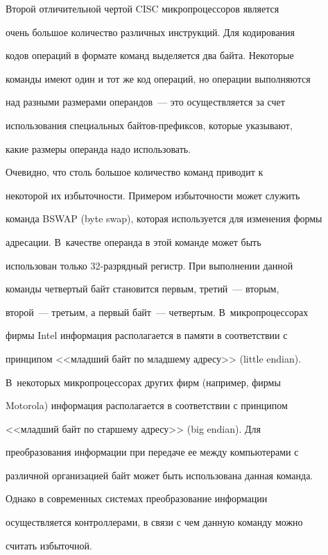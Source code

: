  


 Второй отличительной чертой CISC микропроцессоров является 


очень большое количество различных инструкций. Для кодирования 


кодов операций в формате команд выделяется два байта.  Некоторые  


команды имеют один и тот же код операций,  но операции выполняются 


над разными размерами операндов~--- это осуществляется за счет 


использования специальных бай\-тов-пре\-фик\-сов, которые указывают, 


какие размеры операнда надо использовать.   





Очевидно, что столь большое количество команд приводит к 


некоторой их избыточности.  Примером избыточности может служить 


команда  BSWAP (byte swap),  которая используется для изменения формы 


адресации. В~качестве операнда в этой команде может быть 


использован только 32-раз\-ряд\-ный регистр. При выполнении данной 


команды четвертый байт становится первым, третий~--- вторым, 


второй~--- третьим, а первый байт~--- четвертым. В~микропроцессорах 


фирмы Intel информация располагается в памяти в соответствии с 


принципом <<младший байт по младшему адресу>> (little endian). 


В~некоторых микропроцессорах других фирм  (например, фирмы 


Motorola) информация располагается в соответствии с принципом 


<<младший байт по старшему адресу>> (big endian). Для 


преобразования  информации при передаче ее между компьютерами с 


различной организацией байт может быть использована данная команда. 


Однако в современных системах преобразование информации 


осуществляется контроллерами, в связи с чем данную команду можно 


считать избыточной.





